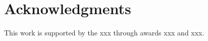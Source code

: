 \vspace{-15pt}
\section{Acknowledgments}\label{sec:acknowlegments}
\vspace{-10pt}
This work is supported by the xxx through awards xxx and xxx. %
